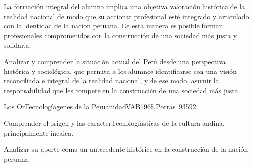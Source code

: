 \begin{syllabus}


\begin{justification}
La formación integral del alumno implica una objetiva valoración histórica de la 
realidad nacional de modo que su accionar profesional esté integrado y articulado 
con la identidad de la nación peruana. De esta manera es posible formar profesionales 
comprometidos con la construcción de una sociedad más justa y solidaria.
\end{justification}

\begin{goals}
\item Analizar y comprender la situación actual del Perú desde una perspectiva 
histórica y sociológica, que permita a los alumnos identificarse con una visión 
reconciliada e integral de la realidad nacional, y de ese modo, asumir la 
responsabilidad que les compete en la construcción de una sociedad más justa.
\end{goals}

\begin{outcomes}
\end{outcomes}

\begin{unit}{Los OrTecnologíagenes de la Peruanidad}{VAB1965,Porras1935}{9}{2}
\begin{topics}
      \item 
\end{topics}
\begin{unitgoals}
      \item Comprender el origen y las caracterTecnologíasticas de la cultura andina, principalmente incaica.
      \item Analizar su aporte como un antecedente histórico en la construcción de la nación peruana.
\end{unitgoals}
\end{unit}


\end{syllabus}
